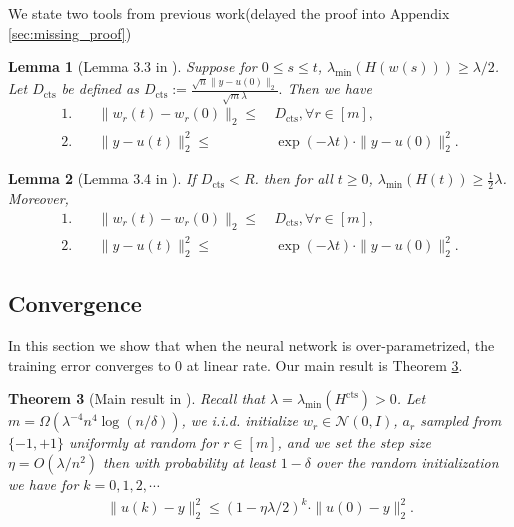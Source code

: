 \documentclass[11pt]{article}
\newcommand{\N}{\mathcal{N}}
\DeclareMathOperator{\cts}{cts}
\newtheorem{theorem}{Theorem}
\newtheorem{lemma}[theorem]{Lemma}
\begin{document}
We state two tools from previous work(delayed the proof into Appendix \ref{sec:missing_proof})

\begin{lemma}[Lemma 3.3 in \cite{dzps19}]\label{lem:3.3}
Suppose for $0 \leq s \leq t$, $\lambda_{\min} ( H( w(s) ) ) \geq \lambda / 2$. Let $D_{\cts}$ be defined as
$
D_{\cts} := \frac{ \sqrt{n} \| y - u(0) \|_2 }{ \sqrt{m} \lambda }.
$
Then we have 
\begin{align*}
1. & ~ & \| w_r(t) - w_r(0) \|_2 \leq & ~ D_{\cts} , \forall r \in [m], \\
2. & ~ & \| y - u(t) \|_2^2 \leq  &~ \exp( - \lambda t ) \cdot \| y - u(0) \|_2^2.
\end{align*}
\end{lemma}


\begin{lemma}[Lemma 3.4 in \cite{dzps19}]\label{lem:3.4}
If $D_{\cts}<R$.
then for all $t\geq 0$,
$\lambda_{\min}(H(t))\geq \frac{1}{2}\lambda$.
Moreover,
\begin{align*}
1. & ~ & \|w_r(t)-w_r(0)\|_2 \leq & ~ D_{\cts}, \forall r \in [m], \\
2. & ~ & \|y-u(t)\|_2^2 \leq & ~ \exp(-\lambda t) \cdot \|y-u(0)\|_2^2.
\end{align*}
\end{lemma}




\subsection{Convergence}
In this section we show that when the neural network is over-parametrized,
the training error converges to 0 at linear rate.
Our main result is Theorem \ref{thm:quartic}.

\begin{theorem}[Main result in \cite{sy19}]\label{thm:quartic}
Recall that $\lambda=\lambda_{\min}(H^{\cts})>0$.
Let $m = \Omega( \lambda^{-4} n^4 \log (n/\delta) )$, we i.i.d. initialize $w_r \in {\N}(0,I)$, $a_r$ sampled from $\{-1,+1\}$ uniformly at random for $r\in [m]$, and we set the step size $\eta = O( \lambda / n^2 )$ then with probability at least $1-\delta$ over the random initialization we have for $k = 0,1,2,\cdots$
\begin{align}\label{eq:quartic_condition}
\| u (k) - y \|_2^2 \leq ( 1 - \eta \lambda / 2 )^k \cdot \| u (0) - y \|_2^2.
\end{align}
\end{theorem}
\end{document}
